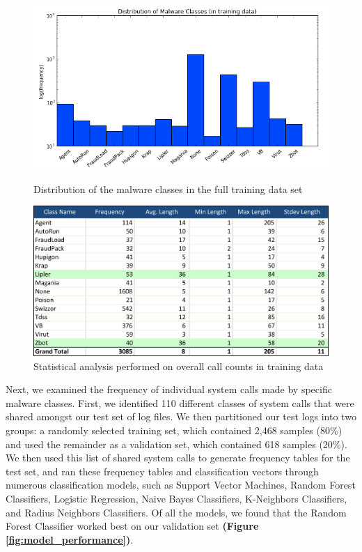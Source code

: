 \documentclass[11pt]{article}
\begin{document}
\begin{figure}[t]
\centering
\includegraphics[width=12cm]{malware_distribution}
\caption{Distribution of the malware classes in the full training data set}
\label{fig:malware_distribution}
\vspace{1cm}
\includegraphics[width=12cm]{length_analysis}
\caption{Statistical analysis performed on overall call counts in training data}
\label{fig:length_analysis}
\end{figure}

Next, we examined the frequency of individual system calls made by specific malware classes. First, we identified 110 different classes of system calls that were shared amongst our test set of log files. We then partitioned our test logs into two groups: a randomly selected training set, which contained 2,468 samples (80\%) and used the remainder as a validation set, which contained 618 samples (20\%). We then used this list of shared system calls to generate frequency tables for the test set, and ran these frequency tables and classification vectors through numerous classification models, such as Support Vector Machines, Random Forest Classifiers, Logistic Regression, Naive Bayes Classifiers, K-Neighbors Classifiers, and Radius Neighbors Classifiers. Of all the models, we found that the Random Forest Classifier worked best on our validation set \textbf{(Figure \ref{fig:model_performance})}.\\
\end{document}
